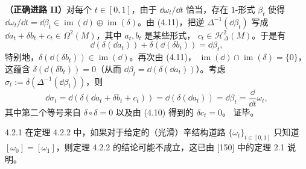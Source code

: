 \begin{wproof}
  \textbf{（正确进路 II）}对每个 $t\in[0,1]$，由于 $\dd\omega_t/\dd t$ 恰当，存在
  $1$-形式 $\beta_t$ 使得
  $\dd\omega_t/\dd t=\dd\beta_t\in\operatorname{im}(\dd)\oplus
  \operatorname{im}(\delta)$。由 (4.11)，把逆 $\Delta^{-1}(\dd\beta_t)$ 写成
  $\dd a_t+\delta b_t+c_t\in\Omega^2(M)$，其中 $a_t,b_t$ 是某些形式，
  $c_t\in\mathcal H_\Delta^2(M)$。于是有
  \begin{equation*}
    \dd(\delta(\dd a_t))+\delta(\dd(\delta b_t))=\dd\beta_t,
  \end{equation*}
  特别地，$\delta(\dd(\delta b_t))\in\operatorname{im}(\dd)$。再次由 (4.11)，
  $\operatorname{im}(\dd)\cap\operatorname{im}(\delta)=\{0\}$，这蕴含
  $\delta(\dd(\delta b_t))=0$（从而 $\dd\beta_t=\dd(\delta(\dd a_t))$）。考虑
  $\sigma_t:=\delta(\Delta^{-1}(\dd\beta_t))$，则
  \begin{equation*}
    \dd\sigma_t=\dd(\delta(\dd a_t+\delta b_t+c_t))
    =\dd(\delta(\dd a_t))=\dd\beta_t=\frac{\dd}{\dd t}\omega_t,
  \end{equation*}
  其中第二个等号来自 $\delta\circ\delta=0$ 以及由 (4.10) 得到的 $\delta c_t=0$。
  证毕。
\end{wproof}

\begin{wrem}{4.2.1}
  在定理 4.2.2 中，如果对于给定的（光滑）辛结构道路 $\{\omega_t\}_{t\in[0,1]}$ 只知道
  $[\omega_0]=[\omega_1]$，则定理 4.2.2 的结论可能不成立，这已由 [150] 中的定理 2.1
  说明。
\end{wrem}
